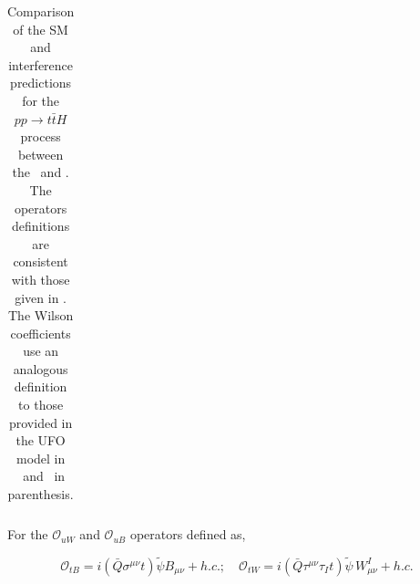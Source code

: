 \begin{table}[h!]
{\begin{tabular}{|l|l|c|c|}
      \hline
    \end{tabular}
  }
  \caption{ Comparison of the SM and interference predictions for the $pp\to t\bar{t} H$ process between the \SMEFTsim\ and \SMEFTatNLO. The operators definitions are consistent with those given in \SMEFTatNLO. The Wilson coefficients use an analogous definition to those provided  in the UFO model in \SMEFTatNLO\ and \SMEFTsim\ in parenthesis.}
  \label{tab:higgseft:tthcompa}
\end{table}








For the $\mathcal{O}_{uW}$ and $\mathcal{O}_{uB}$ operators defined as,

$$ \mathcal{O}_{tB} = i(\bar Q \sigma^{\mu\nu} t) \tilde \psi  B_{\mu\nu} + h.c.; \quad
   \mathcal{O}_{tW} =  i(\bar{Q} \tau^{\mu\nu}\tau_{I} t)  \tilde{\psi} \, W_{\mu\nu}^I + h. c.
$$

